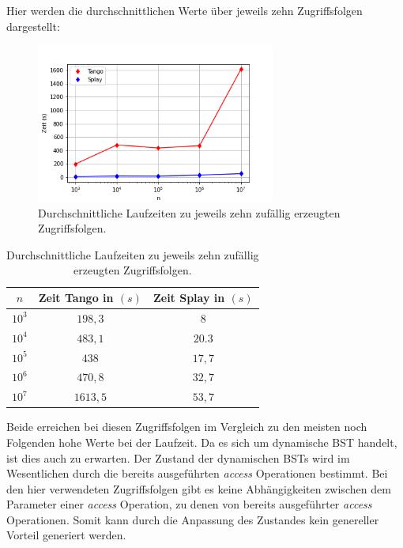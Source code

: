 \documentclass[a4paper,12pt]{article}
\begin{document}
\noindent Hier werden die durchschnittlichen Werte über jeweils zehn Zugriffsfolgen dargestellt:
\begin{figure}[H]
	\centering
	\includegraphics[width=0.7\textwidth]{Medien/laufzeittest/diagramm/randomaccess3}
	\caption{Durchschnittliche Laufzeiten zu jeweils zehn zufällig erzeugten Zugriffsfolgen.}
	
\end{figure}
\begin{table}[H]
	\begin{center}
		\begin{tabular}[c]{|c|c|c|}
			\hline
			$n$ & Zeit Tango in $\left(s\right)$ &Zeit Splay in $\left(s\right)$ \\
			\hline
			$10^3$ & $198,3$ &$8$ \\
			\hline
			$10^4$  & $483,1$ &$20.3$  \\
			\hline
			$10^5$  & $438$ &$17,7$  \\
			\hline
			$10^6$  & $470,8$ &$32,7$  \\
			\hline
			$10^7$  & $1613,5$ &$53,7$  \\
			\hline
		\end{tabular}
		\caption{Durchschnittliche Laufzeiten zu jeweils zehn zufällig erzeugten Zugriffsfolgen.} 
	\end{center}
\end{table}
\noindent Beide erreichen bei diesen Zugriffsfolgen im Vergleich zu den meisten noch Folgenden hohe Werte bei der Laufzeit. Da es sich um dynamische BST handelt, ist dies auch zu erwarten. Der Zustand der dynamischen BSTs wird im Wesentlichen durch  die  bereits ausgeführten \textit{access} Operationen bestimmt. Bei den hier verwendeten Zugriffsfolgen gibt es keine Abhängigkeiten zwischen dem Parameter einer \textit{access} Operation, zu denen von bereits ausgeführter \textit{access} Operationen. Somit kann durch die Anpassung des Zustandes kein genereller Vorteil generiert werden.\\
\end{document}
